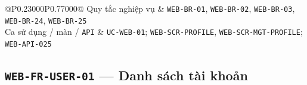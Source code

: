 \begin{longtable}{@{}P{0.23000\SRSWidth}P{0.77000\SRSWidth}@{}}
Quy tắc nghiệp vụ & \texttt{WEB-\allowbreak{}BR-\allowbreak{}01}, \texttt{WEB-\allowbreak{}BR-\allowbreak{}02}, \texttt{WEB-\allowbreak{}BR-\allowbreak{}03}, \texttt{WEB-\allowbreak{}BR-\allowbreak{}24}, \texttt{WEB-\allowbreak{}BR-\allowbreak{}25} \\[3pt]
Ca sử dụng /\allowbreak{} màn /\allowbreak{} \texttt{API} & \texttt{UC-\allowbreak{}WEB-\allowbreak{}01}; \texttt{WEB-\allowbreak{}SCR-\allowbreak{}PROFILE}, \texttt{WEB-\allowbreak{}SCR-\allowbreak{}MGT-\allowbreak{}PROFILE}; \texttt{WEB-\allowbreak{}API-\allowbreak{}025} \\[3pt]
\end{longtable}
\endgroup

\subsection{\texttt{WEB-\allowbreak{}FR-\allowbreak{}USER-\allowbreak{}01} — Danh sách tài khoản}
\begingroup
\fontsize{9.5}{12}\selectfont
\setlength{\SRSWidth}{\dimexpr\linewidth-2\tabcolsep\relax}
